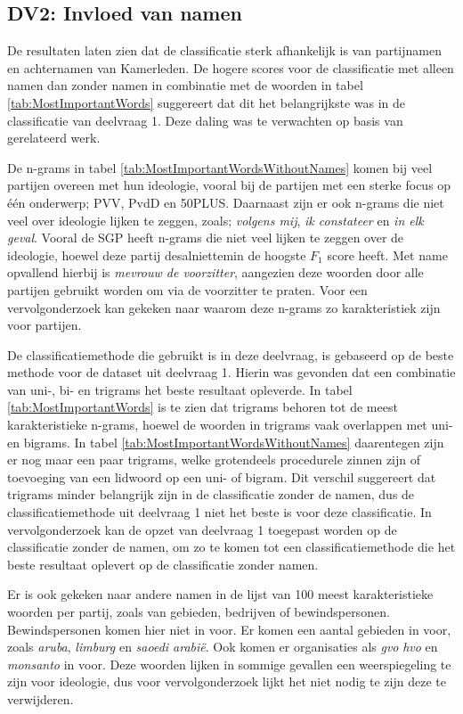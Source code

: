 \subsection{DV2: Invloed van namen}
De resultaten laten zien dat de classificatie sterk afhankelijk is van partijnamen en achternamen van Kamerleden. De hogere scores voor de classificatie met alleen namen dan zonder namen in combinatie met de woorden in tabel \ref{tab:MostImportantWords} suggereert dat dit het belangrijkste was in de classificatie van deelvraag 1. Deze daling was te verwachten op basis van gerelateerd werk.\par
De n-grams in tabel \ref{tab:MostImportantWordsWithoutNames} komen bij veel partijen overeen met hun ideologie, vooral bij de partijen met een sterke focus op één onderwerp; PVV, PvdD en 50PLUS. Daarnaast zijn er ook n-grams die niet veel over ideologie lijken te zeggen, zoals; \textit{volgens mij}, \textit{ik constateer} en \textit{in elk geval}. Vooral de SGP heeft n-grams die niet veel lijken te zeggen over de ideologie, hoewel deze partij desalniettemin de hoogste $F_1$ score heeft. Met name opvallend hierbij is \textit{mevrouw de voorzitter}, aangezien deze woorden door alle partijen gebruikt worden om via de voorzitter te praten. Voor een vervolgonderzoek kan gekeken naar waarom deze n-grams zo karakteristiek zijn voor partijen.\par
De classificatiemethode die gebruikt is in deze deelvraag, is gebaseerd op de beste methode voor de dataset uit deelvraag 1. Hierin was gevonden dat een combinatie van uni-, bi- en trigrams het beste resultaat opleverde. In tabel \ref{tab:MostImportantWords} is te zien dat trigrams behoren tot de meest karakteristieke n-grams, hoewel de woorden in trigrams vaak overlappen met uni- en bigrams. In tabel \ref{tab:MostImportantWordsWithoutNames} daarentegen zijn er nog maar een paar trigrams, welke grotendeels procedurele zinnen zijn of toevoeging van een lidwoord op een uni- of bigram. Dit verschil suggereert dat trigrams minder belangrijk zijn in de classificatie zonder de namen, dus de classificatiemethode uit deelvraag 1 niet het beste is voor deze classificatie. In vervolgonderzoek kan de opzet van deelvraag 1 toegepast worden op de classificatie zonder de namen, om zo te komen tot een classificatiemethode die het beste resultaat oplevert op de classificatie zonder namen.\par
Er is ook gekeken naar andere namen in de lijst van 100 meest karakteristieke woorden per partij, zoals van gebieden, bedrijven of bewindspersonen. Bewindspersonen komen hier niet in voor. Er komen een aantal gebieden in voor, zoals \textit{aruba}, \textit{limburg} en \textit{saoedi arabië}. Ook komen er organisaties als \textit{gvo} \textit{hvo} en \textit{monsanto} in voor. Deze woorden lijken in sommige gevallen een weerspiegeling te zijn voor ideologie, dus voor vervolgonderzoek lijkt het niet nodig te zijn deze te verwijderen.\par

